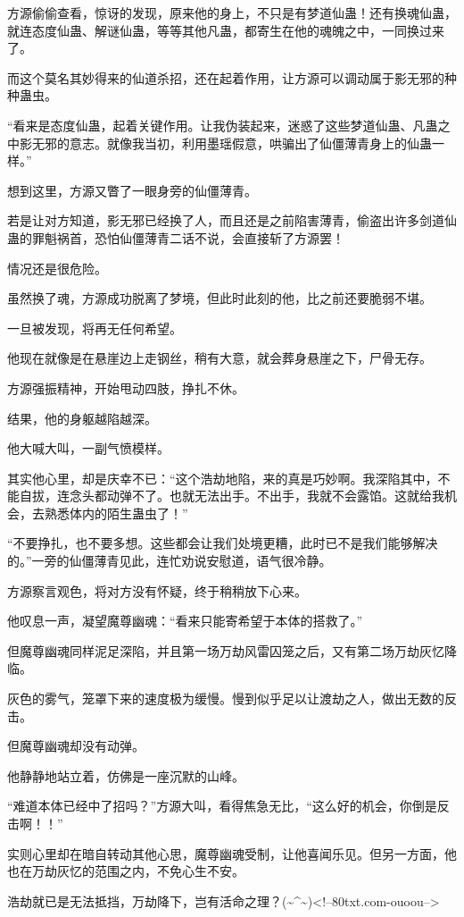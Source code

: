 \begin{this_body}
方源偷偷查看，惊讶的发现，原来他的身上，不只是有梦道仙蛊！还有换魂仙蛊，就连态度仙蛊、解谜仙蛊，等等其他凡蛊，都寄生在他的魂魄之中，一同换过来了。

而这个莫名其妙得来的仙道杀招，还在起着作用，让方源可以调动属于影无邪的种种蛊虫。

“看来是态度仙蛊，起着关键作用。让我伪装起来，迷惑了这些梦道仙蛊、凡蛊之中影无邪的意志。就像我当初，利用墨瑶假意，哄骗出了仙僵薄青身上的仙蛊一样。”

想到这里，方源又瞥了一眼身旁的仙僵薄青。

若是让对方知道，影无邪已经换了人，而且还是之前陷害薄青，偷盗出许多剑道仙蛊的罪魁祸首，恐怕仙僵薄青二话不说，会直接斩了方源罢！

情况还是很危险。

虽然换了魂，方源成功脱离了梦境，但此时此刻的他，比之前还要脆弱不堪。

一旦被发现，将再无任何希望。

他现在就像是在悬崖边上走钢丝，稍有大意，就会葬身悬崖之下，尸骨无存。

方源强振精神，开始甩动四肢，挣扎不休。

结果，他的身躯越陷越深。

他大喊大叫，一副气愤模样。

其实他心里，却是庆幸不已：“这个浩劫地陷，来的真是巧妙啊。我深陷其中，不能自拔，连念头都动弹不了。也就无法出手。不出手，我就不会露馅。这就给我机会，去熟悉体内的陌生蛊虫了！”

“不要挣扎，也不要多想。这些都会让我们处境更糟，此时已不是我们能够解决的。”一旁的仙僵薄青见此，连忙劝说安慰道，语气很冷静。

方源察言观色，将对方没有怀疑，终于稍稍放下心来。

他叹息一声，凝望魔尊幽魂：“看来只能寄希望于本体的搭救了。”

但魔尊幽魂同样泥足深陷，并且第一场万劫风雷囚笼之后，又有第二场万劫灰忆降临。

灰色的雾气，笼罩下来的速度极为缓慢。慢到似乎足以让渡劫之人，做出无数的反击。

但魔尊幽魂却没有动弹。

他静静地站立着，仿佛是一座沉默的山峰。

“难道本体已经中了招吗？”方源大叫，看得焦急无比，“这么好的机会，你倒是反击啊！！”

实则心里却在暗自转动其他心思，魔尊幽魂受制，让他喜闻乐见。但另一方面，他也在万劫灰忆的范围之内，不免心生不安。

浩劫就已是无法抵挡，万劫降下，岂有活命之理？(\~{}\^{}\~{})<!--80txt.com-ouoou-->

\end{this_body}

